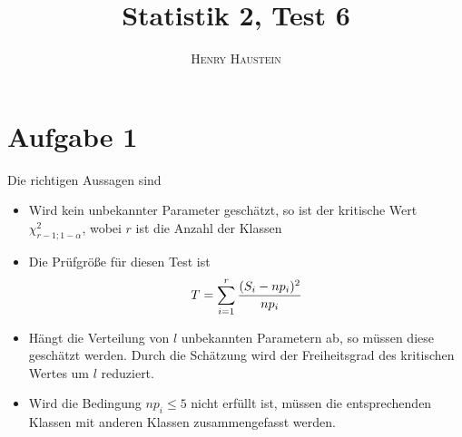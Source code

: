 \documentclass{article}
\title{\textbf{Statistik 2, Test 6}}
\author{\textsc{Henry Haustein}}
\date{}
\begin{document}
	\maketitle
	
	\section*{Aufgabe 1}
	Die richtigen Aussagen sind
	\begin{itemize}
		\item Wird kein unbekannter Parameter geschätzt, so ist der kritische Wert $\chi^2_{r-1;1-\alpha}$, wobei $r$ ist die Anzahl der Klassen
		\item Die Prüfgröße für diesen Test ist
		\begin{align}
			T = \sum_{i=1}^{r} \frac{(S_i-np_i)^2}{np_i} \notag
		\end{align}
		\item Hängt die Verteilung von $l$ unbekannten Parametern ab, so müssen diese geschätzt werden. Durch die Schätzung wird der Freiheitsgrad des kritischen Wertes um $l$ reduziert.
		\item Wird die Bedingung $np_i\le 5$ nicht erfüllt ist, müssen die entsprechenden Klassen mit anderen Klassen zusammengefasst werden.
	\end{itemize} 
\end{document}
